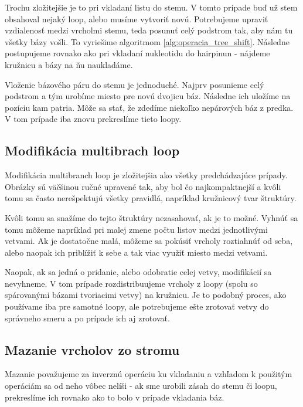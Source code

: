 Trochu zložitejšie je to pri vkladaní listu do stemu. V tomto prípade buď už stem
obsahoval nejaký loop, alebo musíme vytvoriť novú. Potrebujeme upraviť vzdialenosť
medzi vrcholmi stemu, teda posunuť celý podstrom tak, aby nám tu všetky bázy vošli.
To vyriešime algoritmom \ref{alg:operacia_tree_shift}. Následne postupujeme
rovnako ako pri vkladaní nukleotidu do hairpinun - nájdeme kružnicu a bázy
na ňu naukladáme.

Vloženie bázového páru do stemu je jednoduché. Najprv posunieme celý podstrom
a tým urobíme miesto pre novú dvojicu báz. Následne ich uložíme na pozíciu kam patria.
Môže sa stať, že zdedíme niekoľko nepárových báz z predka. V tom prípade iba
znovu prekreslíme tieto loopy.





\subsection{Modifikácia multibrach loop}

Modifikácia multibranch loop je zložitejšia ako všetky predchádzajúce prípady.
Obrázky sú väčšinou ručné upravené tak, aby bol čo najkompaktnejší a kvôli tomu
sa často nerešpektujú všetky pravidlá, napríklad kružnicový tvar štruktúry.

Kvôli tomu sa snažíme do tejto štruktúry nezasahovať, ak je to možné.
Vyhnúť sa tomu môžeme napríklad pri malej zmene počtu listov medzi jednotlivými vetvami.
Ak je dostatočne malá, môžeme sa pokúsiť vrcholy roztiahnúť od seba, alebo naopak ich
priblížiť k sebe a tak viac využiť miesto medzi vetvami.

Naopak, ak sa jedná o pridanie, alebo odobratie celej vetvy, modifikácií sa nevyhneme.
V tom prípade rozdistribuujeme vrcholy z loopy (spolu so spárovanými bázami tvoriacimi
vetvy) na kružnicu. Je to podobný proces, ako používame iba pre samotné loopy,
ale potrebujeme ešte zrotovať vetvy do správneho smeru a po prípade ich aj zrotovať.





\subsection{Mazanie vrcholov zo stromu}

Mazanie považujeme za inverznú operáciu ku vkladaniu a vzhľadom k použitým operáciám
sa od neho vôbec nelíši - ak sme urobili zásah do stemu či loopu, prekreslíme
ich rovnako ako to bolo v prípade vkladania báz.




